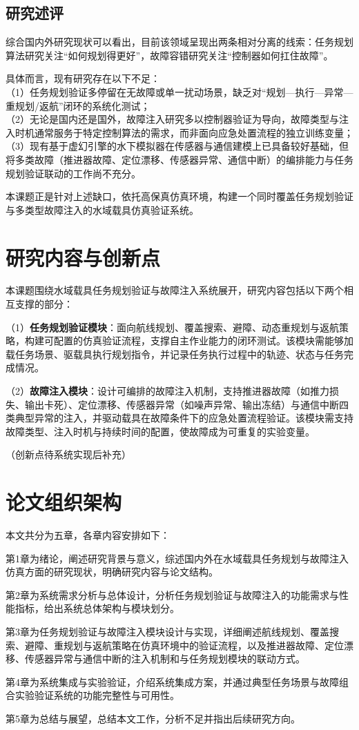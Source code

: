 \subsection{研究述评}

综合国内外研究现状可以看出，目前该领域呈现出两条相对分离的线索：任务规划算法研究关注“如何规划得更好”，故障容错研究关注“控制器如何扛住故障”。

具体而言，现有研究存在以下不足：\\
（1）任务规划验证多停留在无故障或单一扰动场景，缺乏对“规划—执行—异常—重规划/返航”闭环的系统化测试；\\
（2）无论是国内还是国外，故障注入研究多以控制器验证为导向，故障类型与注入时机通常服务于特定控制算法的需求，而非面向应急处置流程的独立训练变量；\\
（3）现有基于虚幻引擎的水下模拟器在传感器与通信建模上已具备较好基础，但将多类故障（推进器故障、定位漂移、传感器异常、通信中断）的编排能力与任务规划验证联动的工作尚不充分。

本课题正是针对上述缺口，依托高保真仿真环境，构建一个同时覆盖任务规划验证与多类型故障注入的水域载具仿真验证系统。

\section{研究内容与创新点}

本课题围绕水域载具任务规划验证与故障注入系统展开，研究内容包括以下两个相互支撑的部分：

（1）\textbf{任务规划验证模块}：面向航线规划、覆盖搜索、避障、动态重规划与返航策略，构建可配置的仿真验证流程，支撑自主作业能力的闭环测试。该模块需能够加载任务场景、驱载具执行规划指令，并记录任务执行过程中的轨迹、状态与任务完成情况。

（2）\textbf{故障注入模块}：设计可编排的故障注入机制，支持推进器故障（如推力损失、输出卡死）、定位漂移、传感器异常（如噪声异常、输出冻结）与通信中断四类典型异常的注入，并驱动载具在故障条件下的应急处置流程验证。该模块需支持故障类型、注入时机与持续时间的配置，使故障成为可重复的实验变量。

（创新点待系统实现后补充）

\section{论文组织架构}

本文共分为五章，各章内容安排如下：

第1章为绪论，阐述研究背景与意义，综述国内外在水域载具任务规划与故障注入仿真方面的研究现状，明确研究内容与论文结构。

第2章为系统需求分析与总体设计，分析任务规划验证与故障注入的功能需求与性能指标，给出系统总体架构与模块划分。

第3章为任务规划验证与故障注入模块设计与实现，详细阐述航线规划、覆盖搜索、避障、重规划与返航策略在仿真环境中的验证流程，以及推进器故障、定位漂移、传感器异常与通信中断的注入机制和与任务规划模块的联动方式。

第4章为系统集成与实验验证，介绍系统集成方案，并通过典型任务场景与故障组合实验验证系统的功能完整性与可用性。

第5章为总结与展望，总结本文工作，分析不足并指出后续研究方向。

